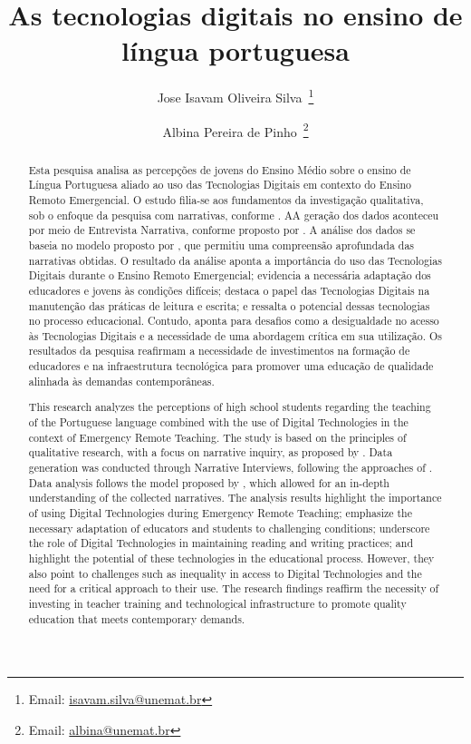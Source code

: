 \documentclass[portuguese]{textolivre}
\title{As tecnologias digitais no ensino de língua portuguesa}
\author[1]{Jose Isavam Oliveira Silva~\orcid{0009-0005-2026-7129}\thanks{Email: \href{mailto:isavam.silva@unemat.br}{isavam.silva@unemat.br}}}
\author[2]{Albina Pereira de Pinho~\orcid{0000-0002-5139-9299}\thanks{Email: \href{mailto:albina@unemat.br}{albina@unemat.br}}}
\affil[1]{Universidade do Estado de Mato Grosso, Programa de Pós-Graduação em Letras, Sinop, MT, Brasil.}
\affil[2]{Universidade do Estado de Mato Grosso, Faculdade de Ciências Humanas e Letras de Sinop, Sinop, MT, Brasil.}
\begin{document}
\maketitle

\begin{polyabstract}
\begin{abstract}
Esta pesquisa analisa as percepções de jovens do Ensino Médio sobre o ensino de Língua Portuguesa aliado ao uso das Tecnologias Digitais em contexto do Ensino Remoto Emergencial. O estudo filia-se aos fundamentos da investigação qualitativa, sob o enfoque da pesquisa com narrativas, conforme \textcite{todorov1983}. AA geração dos dados aconteceu por meio de Entrevista Narrativa, conforme proposto por \textcite{jovchelovitch2002}. A análise dos dados se baseia no modelo proposto por \textcite{lieblich1998}, que permitiu uma compreensão aprofundada das narrativas obtidas. O resultado da análise aponta a importância do uso das Tecnologias Digitais durante o Ensino Remoto Emergencial; evidencia a necessária adaptação dos educadores e jovens às condições difíceis; destaca o papel das Tecnologias Digitais na manutenção das práticas de leitura e escrita; e ressalta o potencial dessas tecnologias no processo educacional. Contudo, aponta para desafios como a desigualdade no acesso às Tecnologias Digitais e a necessidade de uma abordagem crítica em sua utilização. Os resultados da pesquisa reafirmam a necessidade de investimentos na formação de educadores e na infraestrutura tecnológica para promover uma educação de qualidade alinhada às demandas contemporâneas.

\end{abstract}

\begin{english}
\begin{abstract}
This research analyzes the perceptions of high school students regarding the teaching of the Portuguese language combined with the use of Digital Technologies in the context of Emergency Remote Teaching. The study is based on the principles of qualitative research, with a focus on narrative inquiry, as proposed by \textcite{todorov1983}. Data generation was conducted through Narrative Interviews, following the approaches of \textcite{jovchelovitch2002}. Data analysis follows the model proposed by \textcite{lieblich1998}, which allowed for an in-depth understanding of the collected narratives. The analysis results highlight the importance of using Digital Technologies during Emergency Remote Teaching; emphasize the necessary adaptation of educators and students to challenging conditions; underscore the role of Digital Technologies in maintaining reading and writing practices; and highlight the potential of these technologies in the educational process. However, they also point to challenges such as inequality in access to Digital Technologies and the need for a critical approach to their use. The research findings reaffirm the necessity of investing in teacher training and technological infrastructure to promote quality education that meets contemporary demands.


\end{abstract}
\end{english}
\end{polyabstract}
\end{document}
